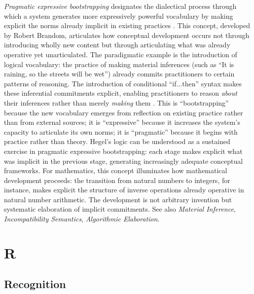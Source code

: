 \documentclass{book}
\begin{document}
\textit{Pragmatic expressive bootstrapping} designates the dialectical process through which a system generates more expressively powerful vocabulary by making explicit the norms already implicit in existing practices \parencite{brandom1994making, Brandom2000}. This concept, developed by Robert Brandom, articulates how conceptual development occurs not through introducing wholly new content but through articulating what was already operative yet unarticulated. The paradigmatic example is the introduction of logical vocabulary: the practice of making material inferences (such as ``It is raining, so the streets will be wet'') already commits practitioners to certain patterns of reasoning. The introduction of conditional ``if...then'' syntax makes these inferential commitments explicit, enabling practitioners to reason \textit{about} their inferences rather than merely \textit{making} them \parencite{brandom1994making}. This is ``bootstrapping'' because the new vocabulary emerges from reflection on existing practice rather than from external sources; it is ``expressive'' because it increases the system's capacity to articulate its own norms; it is ``pragmatic'' because it begins with practice rather than theory. Hegel's logic can be understood as a sustained exercise in pragmatic expressive bootstrapping: each stage makes explicit what was implicit in the previous stage, generating increasingly adequate conceptual frameworks. For mathematics, this concept illuminates how mathematical development proceeds: the transition from natural numbers to integers, for instance, makes explicit the structure of inverse operations already operative in natural number arithmetic. The development is not arbitrary invention but systematic elaboration of implicit commitments. See also \textit{Material Inference}, \textit{Incompatibility Semantics}, \textit{Algorithmic Elaboration}.

\chapter{R}

\section{Recognition}
\end{document}

